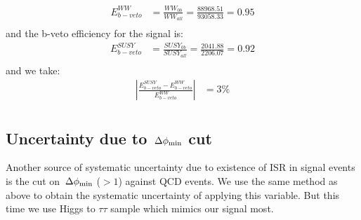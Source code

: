 \begin{align}
E^{WW}_{b-veto} &= \frac{WW_{0b}}{WW_{all}} = \frac{88968.51}{93058.33} = 0.95\\ \nonumber
\end{align}
and the b-veto efficiency for the signal is:
\begin{align}
E^{SUSY}_{b-veto} &= \frac{SUSY_{0b}}{SUSY_{all}} = \frac{2041.88}{2206.07} = 0.92 \\ \nonumber
\end{align}
and we take:
\begin{align}
|\frac{E^{SUSY}_{b-veto}-E^{WW}_{b-veto}}{E^{WW}_{b-veto}}| &= 3 \% \\ \nonumber
\end{align}







\subsection{\texorpdfstring{Uncertainty due to $\,{\Delta\phi_{\rm min}}$ cut}{Uncertainty due to minDeltaPhiJMET cut}}
Another source of systematic uncertainty due to existence of ISR in signal events is the cut on $\,{\Delta\phi_{\rm min}}$ ($ > 1$) against QCD events. We use the same method as above to obtain the systematic uncertainty of applying this variable. But this time we use Higgs to $\tau \tau$ sample which mimics our signal most.

